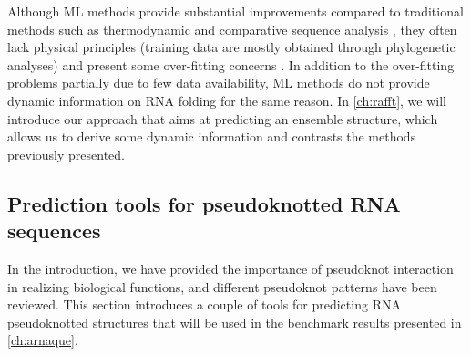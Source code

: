 Although \ac{ML} methods provide substantial improvements compared to traditional methods such as thermodynamic and comparative sequence analysis \cite{singh19_rna_secon_struc_predic_using,sato20_rna}, they often lack physical principles (training data are mostly obtained through phylogenetic analyses) and present some over-fitting concerns \cite{rivas11_range_compl_probab_model_rna}. In addition to the over-fitting problems partially due to few data availability,  \ac{ML} methods do not provide dynamic information on \ac{RNA} folding for the same reason. In \autoref{ch:rafft}, we will introduce our approach that aims at predicting an ensemble structure, which allows us to derive some dynamic information and contrasts the methods previously presented. 

\subsection{Prediction tools for pseudoknotted \ac{RNA} sequences}
In the introduction, we have provided the importance of pseudoknot interaction in realizing biological functions, and different pseudoknot patterns have been reviewed. This section introduces a couple of tools for predicting \ac{RNA} pseudoknotted structures that will be used in the benchmark results presented in \autoref{ch:arnaque}.

